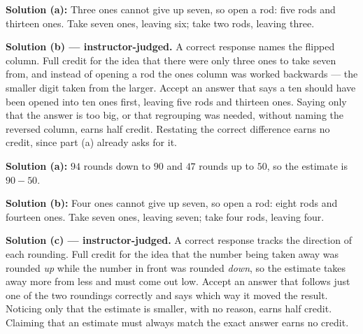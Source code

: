 \documentclass[12pt]{article}
\begin{document}

\textbf{Solution (a):} Three ones cannot give up seven, so open a rod: five rods and thirteen ones. Take seven ones, leaving six; take two rods, leaving three. 

\textbf{Solution (b) --- instructor-judged.} A correct response names the flipped column. Full credit for the idea that there were only three ones to take seven from, and instead of opening a rod the ones column was worked backwards --- the smaller digit taken from the larger. Accept an answer that says a ten should have been opened into ten ones first, leaving five rods and thirteen ones. Saying only that the answer is too big, or that regrouping was needed, without naming the reversed column, earns half credit. Restating the correct difference earns no credit, since part (a) already asks for it.


\textbf{Solution (a):} $94$ rounds down to $90$ and $47$ rounds up to $50$, so the estimate is $90 - 50$. 

\textbf{Solution (b):} Four ones cannot give up seven, so open a rod: eight rods and fourteen ones. Take seven ones, leaving seven; take four rods, leaving four. 

\textbf{Solution (c) --- instructor-judged.} A correct response tracks the direction of each rounding. Full credit for the idea that the number being taken away was rounded \emph{up} while the number in front was rounded \emph{down}, so the estimate takes away more from less and must come out low. Accept an answer that follows just one of the two roundings correctly and says which way it moved the result. Noticing only that the estimate is smaller, with no reason, earns half credit. Claiming that an estimate must always match the exact answer earns no credit.
\end{document}
